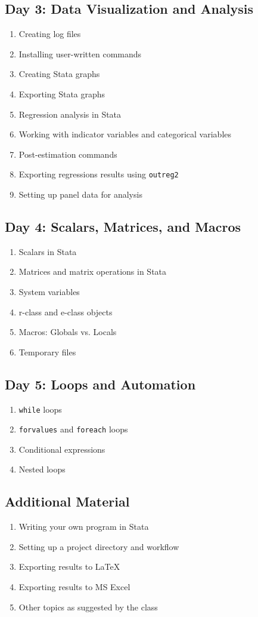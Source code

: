 \documentclass[11pt]{article}
\begin{document}
\subsection*{Day 3: Data Visualization and Analysis}
\begin{enumerate}
\setlength\itemsep{-0.5em}
\item Creating log files
\item Installing user-written commands
\item Creating Stata graphs
\item Exporting Stata graphs
\item Regression analysis in Stata
\item Working with indicator variables and categorical variables
\item Post-estimation commands
\item Exporting regressions results using \verb!outreg2! 
\item Setting up panel data for analysis 
\end{enumerate}


\subsection*{Day 4: Scalars, Matrices, and Macros}
\begin{enumerate}
\setlength\itemsep{-0.5em}
\item Scalars in Stata
\item Matrices and matrix operations in Stata
\item System variables
\item r-class and e-class objects
\item Macros: Globals vs. Locals
\item Temporary files
\end{enumerate}

\subsection*{Day 5: Loops and Automation}
\begin{enumerate}
\setlength\itemsep{-0.5em}
\item \verb!while! loops 
\item \verb!forvalues! and \verb!foreach! loops  
\item Conditional expressions
\item Nested loops
\end{enumerate}

\subsection*{Additional Material}
\begin{enumerate}
\setlength\itemsep{-0.5em}
\item Writing your own program in Stata
\item Setting up a project directory and workflow
\item Exporting results to \LaTeX
\item Exporting results to MS Excel
\item Other topics as suggested by the class
\end{enumerate}
\end{document}
